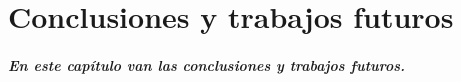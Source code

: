 \chapter{Conclusiones y trabajos futuros}\label{conclusiones}

\paragraph{En este cap\'itulo van las conclusiones y trabajos futuros.}